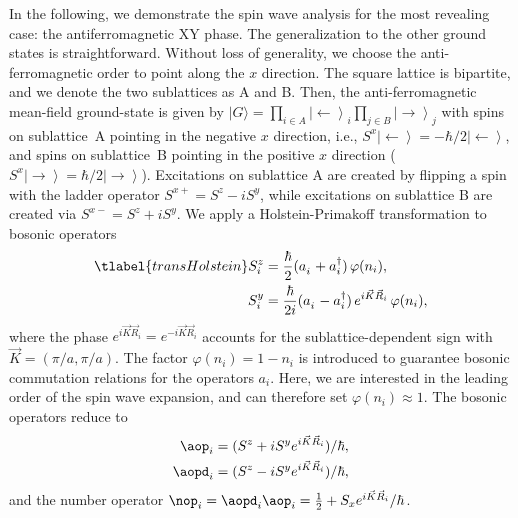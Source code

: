 In the following, we demonstrate the spin wave analysis for the most revealing case: the antiferromagnetic XY phase.
The generalization to the other ground states is straightforward.  Without loss of generality, we choose the anti-ferromagnetic order
to point along the  $x$ direction. The square lattice is bipartite, and we denote the two sublattices as A and B. Then, the anti-ferromagnetic
 mean-field ground-state is given by   $|G\rangle = \prod_{i\in A} \left|\leftarrow\right\rangle_{i} \prod_{j\in B} \left|\rightarrow\right\rangle_{j}$
 with spins on sublattice~A pointing in the negative $x$ direction, i.e., $S^x \left|\leftarrow\right\rangle = -\hbar/2 \left|\leftarrow\right\rangle$,
 and spins on sublattice~B pointing in the positive $x$ direction ($S^x \left|\rightarrow\right\rangle = \hbar/2 \left|\rightarrow\right\rangle$).
 Excitations on sublattice A are created by flipping a spin with the ladder operator $S^{x+} = S^z-i S^y$,
 while excitations on sublattice B are created via $S^{x-} = S^z+i S^y$.
 We apply a Holstein-Primakoff transformation to bosonic operators
\begin{align} \tlabel{transHolstein}
    S^z_i &= \frac{\hbar}{2} (a^{\phantom\dag}_i + a^{\dag}_i) \,\varphi(n_i),\\
    S^y_i &= \frac{\hbar}{2i} (a^{\phantom\dag}_i - a^{\dag}_i)\, e^{i {\vec K} {\vec R_i}} \,\varphi(n_i),
\end{align}
where the phase $e^{i {\vec K}{\vec R_i}}=e^{-i {\vec K}{\vec R_i}}$ accounts for the sublattice-dependent sign with ${\vec K} = (\pi/a, \pi/a)$. The factor $\varphi(n_i)=1-n_i$ is introduced to guarantee bosonic commutation relations for the operators $a_i$.  Here, we are interested in the leading order of the spin wave expansion, and can therefore set
 $\varphi(n_i) \approx 1$. The bosonic operators reduce to
%
\begin{align}
    \aop_i &= (S^z +i S^y e^{i {\vec K} {\vec R_i}} )/\hbar,\\
    \aopd_i &= (S^z -i S^y e^{i {\vec K} {\vec R_i}})/\hbar,
\end{align}
%
and the number operator $\nop_i = \aopd_i \aop_i = \frac{1}{2} + S_x e^{i {\vec K}{\vec R_i}}/\hbar$.


